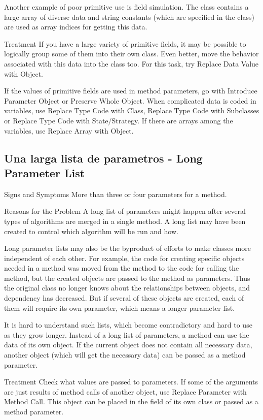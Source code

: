 \documentclass[11pt,a4paper,oneside]{book}
\begin{document}
Another example of poor primitive use is field simulation. The class contains a large array of diverse data and string constants (which are specified in the class) are used as array indices for getting this data.

Treatment
If you have a large variety of primitive fields, it may be possible to logically group some of them into their own class. Even better, move the behavior associated with this data into the class too. For this task, try Replace Data Value with Object.

If the values of primitive fields are used in method parameters, go with Introduce Parameter Object or Preserve Whole Object.
When complicated data is coded in variables, use Replace Type Code with Class, Replace Type Code with Subclasses or Replace Type Code with State/Strategy.
If there are arrays among the variables, use Replace Array with Object.
\subsection{Una larga lista de parametros -   Long Parameter List}
\label{longparameterlist}

Signs and Symptoms
More than three or four parameters for a method.


Reasons for the Problem
A long list of parameters might happen after several types of algorithms are merged in a single method. A long list may have been created to control which algorithm will be run and how.

Long parameter lists may also be the byproduct of efforts to make classes more independent of each other. For example, the code for creating specific objects needed in a method was moved from the method to the code for calling the method, but the created objects are passed to the method as parameters. Thus the original class no longer knows about the relationships between objects, and dependency has decreased. But if several of these objects are created, each of them will require its own parameter, which means a longer parameter list.

It is hard to understand such lists, which become contradictory and hard to use as they grow longer. Instead of a long list of parameters, a method can use the data of its own object. If the current object does not contain all necessary data, another object (which will get the necessary data) can be passed as a method parameter.

Treatment
Check what values are passed to parameters. If some of the arguments are just results of method calls of another object, use Replace Parameter with Method Call. This object can be placed in the field of its own class or passed as a method parameter.
\end{document}
